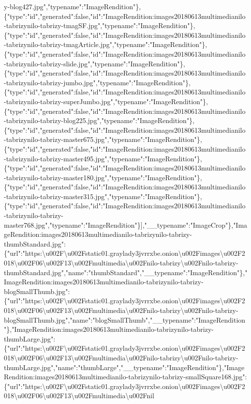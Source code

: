 y-blog427.jpg","typename":"ImageRendition"\},\{"type":"id","generated":false,"id":"ImageRendition:images20180613multimedianilo-tabrizynilo-tabrizy-tmagSF.jpg","typename":"ImageRendition"\},\{"type":"id","generated":false,"id":"ImageRendition:images20180613multimedianilo-tabrizynilo-tabrizy-tmagArticle.jpg","typename":"ImageRendition"\},\{"type":"id","generated":false,"id":"ImageRendition:images20180613multimedianilo-tabrizynilo-tabrizy-slide.jpg","typename":"ImageRendition"\},\{"type":"id","generated":false,"id":"ImageRendition:images20180613multimedianilo-tabrizynilo-tabrizy-jumbo.jpg","typename":"ImageRendition"\},\{"type":"id","generated":false,"id":"ImageRendition:images20180613multimedianilo-tabrizynilo-tabrizy-superJumbo.jpg","typename":"ImageRendition"\},\{"type":"id","generated":false,"id":"ImageRendition:images20180613multimedianilo-tabrizynilo-tabrizy-blog225.jpg","typename":"ImageRendition"\},\{"type":"id","generated":false,"id":"ImageRendition:images20180613multimedianilo-tabrizynilo-tabrizy-master675.jpg","typename":"ImageRendition"\},\{"type":"id","generated":false,"id":"ImageRendition:images20180613multimedianilo-tabrizynilo-tabrizy-master495.jpg","typename":"ImageRendition"\},\{"type":"id","generated":false,"id":"ImageRendition:images20180613multimedianilo-tabrizynilo-tabrizy-master180.jpg","typename":"ImageRendition"\},\{"type":"id","generated":false,"id":"ImageRendition:images20180613multimedianilo-tabrizynilo-tabrizy-master315.jpg","typename":"ImageRendition"\},\{"type":"id","generated":false,"id":"ImageRendition:images20180613multimedianilo-tabrizynilo-tabrizy-master768.jpg","typename":"ImageRendition"\}{]},"\_\_typename":"ImageCrop"\},"ImageRendition:images20180613multimedianilo-tabrizynilo-tabrizy-thumbStandard.jpg":\{"url":"https:\textbackslash{}u002F\textbackslash{}u002Fstatic01.graylady3jvrrxbe.onion\textbackslash{}u002Fimages\textbackslash{}u002F2018\textbackslash{}u002F06\textbackslash{}u002F13\textbackslash{}u002Fmultimedia\textbackslash{}u002Fnilo-tabrizy\textbackslash{}u002Fnilo-tabrizy-thumbStandard.jpg","name":"thumbStandard","\_\_typename":"ImageRendition"\},"ImageRendition:images20180613multimedianilo-tabrizynilo-tabrizy-blogSmallThumb.jpg":\{"url":"https:\textbackslash{}u002F\textbackslash{}u002Fstatic01.graylady3jvrrxbe.onion\textbackslash{}u002Fimages\textbackslash{}u002F2018\textbackslash{}u002F06\textbackslash{}u002F13\textbackslash{}u002Fmultimedia\textbackslash{}u002Fnilo-tabrizy\textbackslash{}u002Fnilo-tabrizy-blogSmallThumb.jpg","name":"blogSmallThumb","\_\_typename":"ImageRendition"\},"ImageRendition:images20180613multimedianilo-tabrizynilo-tabrizy-thumbLarge.jpg":\{"url":"https:\textbackslash{}u002F\textbackslash{}u002Fstatic01.graylady3jvrrxbe.onion\textbackslash{}u002Fimages\textbackslash{}u002F2018\textbackslash{}u002F06\textbackslash{}u002F13\textbackslash{}u002Fmultimedia\textbackslash{}u002Fnilo-tabrizy\textbackslash{}u002Fnilo-tabrizy-thumbLarge.jpg","name":"thumbLarge","\_\_typename":"ImageRendition"\},"ImageRendition:images20180613multimedianilo-tabrizynilo-tabrizy-smallSquare168.jpg":\{"url":"https:\textbackslash{}u002F\textbackslash{}u002Fstatic01.graylady3jvrrxbe.onion\textbackslash{}u002Fimages\textbackslash{}u002F2018\textbackslash{}u002F06\textbackslash{}u002F13\textbackslash{}u002Fmultimedia\textbackslash{}u002Fnil